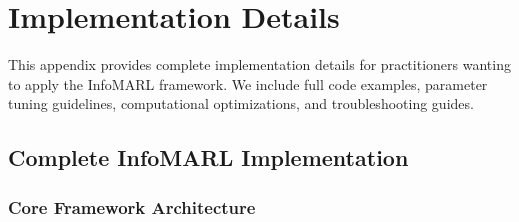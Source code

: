 \documentclass[10pt, letterpaper]{article}
\begin{document}
\section{Implementation Details}
\label{app:impl}

This appendix provides complete implementation details for practitioners wanting to apply the InfoMARL framework. We include full code examples, parameter tuning guidelines, computational optimizations, and troubleshooting guides.

\subsection{Complete InfoMARL Implementation}

\subsubsection{Core Framework Architecture}
\end{document}
